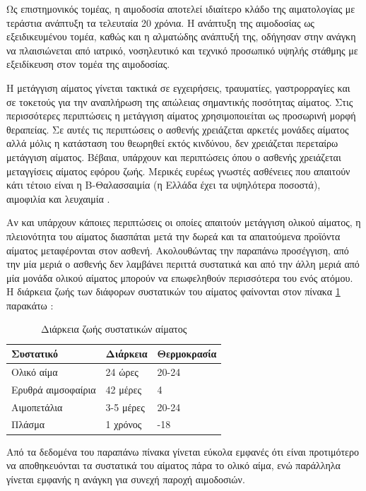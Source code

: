 Ως επιστημονικός τομέας, η αιμοδοσία αποτελεί ιδιαίτερο κλάδο της αιματολογίας με τεράστια ανάπτυξη τα τελευταία 20 χρόνια. Η ανάπτυξη της αιμοδοσίας ως εξειδικευμένου τομέα, καθώς και η αλματώδης ανάπτυξή της, οδήγησαν στην ανάγκη να πλαισιώνεται από ιατρικό, νοσηλευτικό και τεχνικό προσωπικό υψηλής στάθμης με εξειδίκευση στον τομέα της
αιμοδοσίας.  
	
	Η μετάγγιση αίματος γίνεται τακτικά σε εγχειρήσεις, τραυματίες, γαστρορραγίες και σε τοκετούς για την αναπλήρωση της απώλειας σημαντικής ποσότητας αίματος. Στις περισσότερες περιπτώσεις η μετάγγιση αίματος χρησιμοποιείται ως προσωρινή μορφή θεραπείας. Σε αυτές τις περιπτώσεις ο ασθενής χρειάζεται αρκετές μονάδες αίματος αλλά μόλις η κατάσταση του θεωρηθεί εκτός κινδύνου, δεν χρειάζεται περεταίρω μετάγγιση αίματος. Βέβαια, υπάρχουν και περιπτώσεις όπου ο ασθενής χρειάζεται μεταγγίσεις αίματος εφόρου ζωής. Μερικές ευρέως γνωστές ασθένειες που απαιτούν κάτι τέτοιο είναι η Β-Θαλασσαιμία (η Ελλάδα έχει τα υψηλότερα ποσοστά), αιμοφιλία και λευχαιμία \cite{thalassaemiaLongTerm}.

	Αν και υπάρχουν κάποιες περιπτώσεις οι οποίες απαιτούν μετάγγιση ολικού αίματος, η πλειονότητα του αίματος διασπάται μετά την δωρεά και τα απαιτούμενα προϊόντα αίματος μεταφέρονται στον ασθενή. Ακολουθώντας την παραπάνω προσέγγιση, από την μία μεριά ο ασθενής δεν λαμβάνει περιττά συστατικά και από την άλλη μεριά από μία μονάδα ολικού αίματος μπορούν να επωφεληθούν περισσότερα του ενός ατόμου. Η διάρκεια ζωής των διάφορων συστατικών του αίματος φαίνονται στον πίνακα \ref{tab:blood-shelf-life} παρακάτω \cite{Basu2014}:
	
\begin{table}[H]
		\centering
		\begin{tabular}{l|ll}
			\hline
			Συστατικό          & Διάρκεια  & Θερμοκρασία \\ \hline
			Ολικό αίμα         & 24 ώρες   & 20-24       \\
			Ερυθρά αιμσοφαίρια & 42 μέρες  & 4           \\
			Αιμοπετάλια        & 3-5 μέρες & 20-24       \\
			Πλάσμα             & 1 χρόνος  & -18        
		\end{tabular}
		\caption{Διάρκεια ζωής συστατικών αίματος}
		\label{tab:blood-shelf-life}
\end{table}	

Από τα δεδομένα του παραπάνω πίνακα γίνεται εύκολα εμφανές ότι είναι προτιμότερο να αποθηκευόνται τα συστατικά του αίματος πάρα το ολικό αίμα, ενώ παράλληλα γίνεται εμφανής η ανάγκη για συνεχή παροχή αιμοδοσιών.
	
